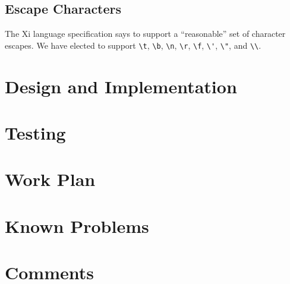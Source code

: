 \documentclass{hw}
\begin{document}
\subsection{Escape Characters}
The Xi language specification says to support a ``reasonable'' set of character
escapes. We have elected to support \verb$\t$, \verb$\b$, \verb$\n$, \verb$\r$,
\verb$\f$, \verb$\'$, \verb$\"$, and \verb$\\$.

\section{Design and Implementation}\label{sec:design}
\section{Testing}\label{sec:testing}
\section{Work Plan}\label{sec:workplan}
\section{Known Problems}\label{sec:problems}
\section{Comments}\label{sec:comments}
\end{document}
